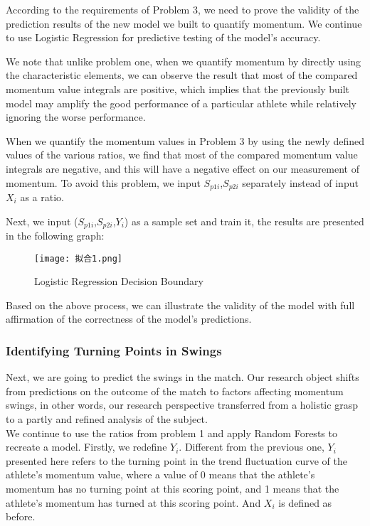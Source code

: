 \documentclass{mcmthesis}
\begin{document}
According to the requirements of Problem 3, we need to prove the validity of the prediction
results of the new model we built to quantify momentum. We continue to use Logistic Regression
for predictive testing of the model's accuracy.

We note that unlike problem one, when we quantify momentum by directly using the characteristic elements, we can observe the result that most of the compared momentum value
integrals are positive, which implies that the previously built model may amplify the good
performance of a particular athlete while relatively ignoring the worse performance.

When we quantify the momentum values in Problem 3 by using the newly defined values of
the various ratios, we find that most of the compared momentum value integrals are negative, and
this will have a negative effect on our measurement of momentum. To avoid this problem, we
input $S_{p1i}$,$S_{p2i}$ separately instead of input $X_{i}$ as a ratio.

Next, we input ($S_{p1i}$,$S_{p2i}$,$Y_{i}$) as a sample set and train it, the results are presented in the
following graph:

\begin{figure}[htbp]
    \centering
    \texttt{[image: 拟合1.png]}
    \caption{Logistic Regression Decision Boundary} \label{Figure 20}
\end{figure}

Based on the above process, we can illustrate the validity of the model with full affirmation
of the correctness of the model's predictions.

\subsubsection{Identifying Turning Points in Swings}
Next, we are going to predict the swings in the match. Our research object shifts from
predictions on the outcome of the match to factors affecting momentum swings, in other words, our research perspective transferred from a holistic grasp to a partly and refined analysis of the
subject.\\
We continue to use the ratios from problem 1 and apply Random Forests to recreate a model. Firstly, we redefine $Y_{i}$. Different from the previous one, $Y_{i}$presented here refers to the turning
point in the trend fluctuation curve of the athlete's momentum value, where a value of 0 means
that the athlete's momentum has no turning point at this scoring point, and 1 means that the
athlete's momentum has turned at this scoring point. And $X_{i}$ is defined as before.
\end{document}
